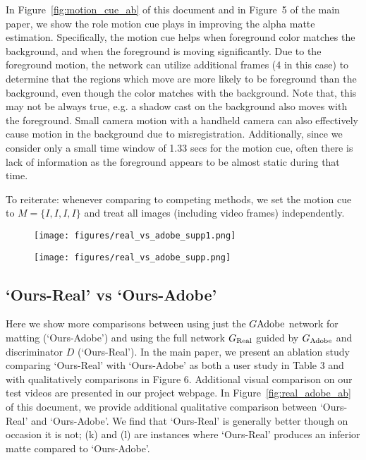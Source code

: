 \documentclass[10pt,twocolumn,letterpaper]{article}
\begin{document}
In Figure~\ref{fig:motion_cue_ab} of this document and in Figure~5 of the main paper, we show the role motion cue plays in improving the alpha matte estimation. Specifically, the motion cue helps when foreground color matches the background, and when the foreground is moving significantly. Due to the foreground motion, the network can utilize additional frames (4 in this case) to determine that the regions which move are more likely to be foreground than the background, even though the color matches with the background. Note that, this may not be always true, e.g. a shadow cast on the background also moves with the foreground. Small camera motion with a handheld camera can also effectively cause motion in the background due to misregistration. Additionally, since we consider only a small time window of 1.33 secs for the motion cue, often there is lack of information as the foreground appears to be almost static during that time. 

To reiterate: whenever comparing to competing methods, we set the motion cue to $M=\{I,I,I,I\}$ and treat all images (including video frames) independently.



\begin{figure*}[!ht]
	\centering
	
	\begin{subfigure}[b]{1\textwidth}
  \texttt{[image: figures/real\_vs\_adobe\_supp1.png]}\end{subfigure}
\qquad
\begin{subfigure}[b]{1\textwidth}\texttt{[image: figures/real\_vs\_adobe\_supp.png]}\end{subfigure}

	\caption{\small \textbf{Ours-Real vs Ours-Adobe.} `Ours-Real' is trained on real data guided by `Ours-Adobe' (trained on synthetic-composite dataset) along with an adversarial loss. (k) and (l) are instances where `Ours-Real' produces worse result compared to `Ours-Adobe'.}
\label{fig:real_adobe_ab}	
\end{figure*}




\subsection{`Ours-Real' vs `Ours-Adobe'}
\label{sec:real_vs_syn}

Here we show more comparisons between using just the $G{\rm Adobe}$ network for matting (`Ours-Adobe') and using the full network $G_{\rm Real}$ guided by $G_{\rm Adobe}$ and discriminator $D$ (`Ours-Real').  In the main paper, we present an ablation study comparing `Ours-Real' with `Ours-Adobe' as both a user study in Table 3 and with qualitatively comparisons in Figure 6. Additional visual comparison on our test videos are presented in our project webpage. In Figure~\ref{fig:real_adobe_ab} of this document, we provide additional qualitative comparison between `Ours-Real' and `Ours-Adobe'. We find that `Ours-Real' is generally better though on occasion it is not; (k) and (l) are instances where `Ours-Real' produces an inferior matte compared to `Ours-Adobe'.
\end{document}
